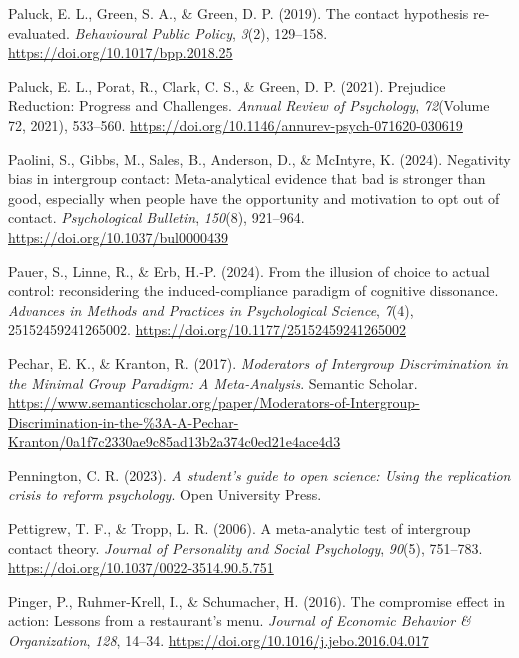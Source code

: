 \documentclass[
  letterpaper,
]{book}
\newlength{\cslhangindent}
\newenvironment{CSLReferences}[2] %
 {\begin{list}{}{%
  \setlength{\itemindent}{0pt}
  \setlength{\leftmargin}{0pt}
  \setlength{\parsep}{0pt}
  \ifodd #1
   \setlength{\leftmargin}{\cslhangindent}
   \setlength{\itemindent}{-1\cslhangindent}
  \fi
  \setlength{\itemsep}{#2\baselineskip}}}
 {\end{list}}
\begin{document}
\begin{CSLReferences}{1}{0}
Paluck, E. L., Green, S. A., \& Green, D. P. (2019). The contact
hypothesis re-evaluated. \emph{Behavioural Public Policy}, \emph{3}(2),
129--158. \url{https://doi.org/10.1017/bpp.2018.25}

Paluck, E. L., Porat, R., Clark, C. S., \& Green, D. P. (2021).
Prejudice {Reduction}: {Progress} and {Challenges}. \emph{Annual Review
of Psychology}, \emph{72}(Volume 72, 2021), 533--560.
\url{https://doi.org/10.1146/annurev-psych-071620-030619}

Paolini, S., Gibbs, M., Sales, B., Anderson, D., \& McIntyre, K. (2024).
Negativity bias in intergroup contact: {Meta}-analytical evidence that
bad is stronger than good, especially when people have the opportunity
and motivation to opt out of contact. \emph{Psychological Bulletin},
\emph{150}(8), 921--964. \url{https://doi.org/10.1037/bul0000439}

Pauer, S., Linne, R., \& Erb, H.-P. (2024). {From the illusion of choice
to actual control: reconsidering the induced-compliance paradigm of
cognitive dissonance}. \emph{{Advances in Methods and Practices in
Psychological Science}}, \emph{7}(4), 25152459241265002.
\url{https://doi.org/10.1177/25152459241265002}

Pechar, E. K., \& Kranton, R. (2017). \emph{Moderators of {Intergroup}
{Discrimination} in the {Minimal} {Group} {Paradigm}: {A}
{Meta}-{Analysis}}. Semantic Scholar.
\url{https://www.semanticscholar.org/paper/Moderators-of-Intergroup-Discrimination-in-the-\%3A-A-Pechar-Kranton/0a1f7c2330ae9c85ad13b2a374c0ed21e4ace4d3}

Pennington, C. R. (2023). \emph{A student's guide to open science: Using
the replication crisis to reform psychology}. Open University Press.

Pettigrew, T. F., \& Tropp, L. R. (2006). A meta-analytic test of
intergroup contact theory. \emph{Journal of Personality and Social
Psychology}, \emph{90}(5), 751--783.
\url{https://doi.org/10.1037/0022-3514.90.5.751}

Pinger, P., Ruhmer-Krell, I., \& Schumacher, H. (2016). The compromise
effect in action: {Lessons} from a restaurant's menu. \emph{Journal of
Economic Behavior \& Organization}, \emph{128}, 14--34.
\url{https://doi.org/10.1016/j.jebo.2016.04.017}


\end{CSLReferences}
\end{document}
